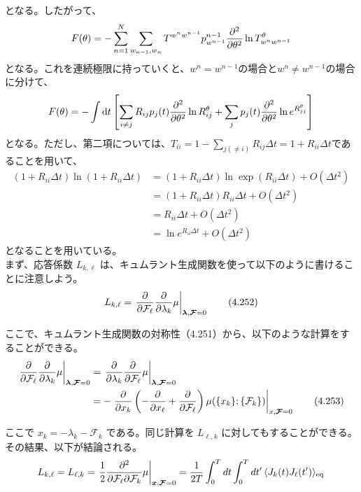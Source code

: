 \documentclass[a4paper,11pt]{jsarticle}
\numberwithin{equation}{section}
\begin{document}
となる。したがって、
\begin{align}
    F(\theta) = -\sum_{n=1}^N \sum_{w_{n-1}, w_n} T^{w^n w^{n-1}} p^{n-1}_{w^{n-1}} \pdv[2]{\theta} \ln T^\theta_{w^n w^{n-1}}
\end{align}
となる。これを連続極限に持っていくと、$w^n = w^{n-1}$の場合と$w^n \neq w^{n-1}$の場合に分けて、
\begin{align}
    F(\theta) = -\int \dd{t} \qty[\sum_{i \neq j} R_{ij} p_j(t) \pdv[2]{\theta} \ln R_{ij}^\theta + \sum_j p_j(t) \pdv[2]{\theta} \ln e^{R_{jj}^\theta}]
\end{align}
となる。ただし、第二項については、$T_{ii} = 1-\sum_{j(\neq i)} R_{ij}\Delta t =1 + R_{ii} \Delta t$であることを用いて、
\begin{align}
    (1+R_{ii}\Delta t )\ln (1+R_{ii}\Delta t) &= (1+R_{ii}\Delta t )\ln \exp(R_{ii}\Delta t) + O(\Delta t^2)\\
    &= (1+R_{ii}\Delta t )R_{ii} \Delta t + O(\Delta t^2)\\
    &= R_{ii} \Delta t + O(\Delta t^2)\\
    &= \ln e^{R_{ii}\Delta t} + O(\Delta t^2)
\end{align}
となることを用いている。\\

まず、応答係数 $L_{k,\ell}$ は、キュムラント生成関数を使って以下のように書けることに注意しよう。
\begin{align}
L_{k,\ell} = \left. \pdv{}{\mathcal{F}_\ell} \pdv{}{\lambda_k} \mu \right|_{\bm{\lambda},\bm{\mathcal{F}}=0} \tag{4.252}
\end{align}

ここで、キュムラント生成関数の対称性（4.251）から、以下のような計算をすることができる。
\begin{align}
\left. \pdv{}{\mathcal{F}_\ell} \pdv{}{\lambda_k} \mu \right|_{\bm{\lambda},\bm{\mathcal{F}}=0}
&= \left. \pdv{}{\lambda_k} \pdv{}{\mathcal{F}_\ell} \mu \right|_{\bm{\lambda},\bm{\mathcal{F}}=0} \nonumber \\
&= - \left. \pdv{}{x_k} \left( -\pdv{}{x_\ell} + \pdv{}{\mathcal{F}_\ell} \right) \mu(\{x_k\};\{\mathcal{F}_k\}) \right|_{x,\bm{\mathcal{F}}=0} \tag{4.253}
\end{align}

ここで $x_k = -\lambda_k - \mathcal{F}_k$ である。同じ計算を $L_{\ell,k}$ に対してもすることができる。その結果、以下が結論される。
\begin{align}
L_{k,\ell} = L_{\ell,k} = \left. \frac{1}{2} \pdv[2]{}{\mathcal{F}_\ell}{\mathcal{F}_k} \mu \right|_{\bm{x},\bm{\mathcal{F}}=0}
= \frac{1}{2T} \int_0^T dt \int_0^T dt' \, \langle J_k(t) J_\ell(t') \rangle_{\mathrm{eq}}
\end{align}
\end{document}
